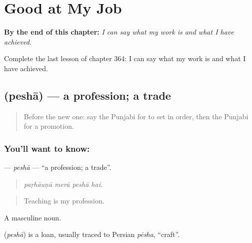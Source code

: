 
\chapter{Good at My Job}
\label{ch:pa-a2-good-at-my-job}

\begin{chapteropening}
\textbf{By the end of this chapter:} \emph{I can say what my work is and what I have achieved.}

Complete the last lesson of chapter 364: I can say what my work is and what I have achieved.
\end{chapteropening}

\section[\texorpdfstring{\pa{ਪੇਸ਼ਾ} (peshā)}{ਪੇਸ਼ਾ (peshā)}]{ (peshā) — a profession; a trade}

\label{lesson:PA-C364-pesha}



\begin{quote}
Before the new one: say the Punjabi for to set in order, then the Punjabi for a promotion.
\end{quote}

\subsection*{You'll want to know: }
\textbf{} — \emph{peshā} — \textquotedblleft{}a profession; a trade\textquotedblright{}.

\begin{quote}
   
\end{quote}

\begin{quote}
\emph{paṛhāuṇā merā peshā hai.}
\end{quote}

\begin{quote}
Teaching is my profession.
\end{quote}

A masculine noun.

\begin{cousinweb}
\textbf{} (\emph{peshā}) is a loan, usually traced to Persian \emph{pēsha}, \textquotedblleft{}craft\textquotedblright{}.
\end{cousinweb}

